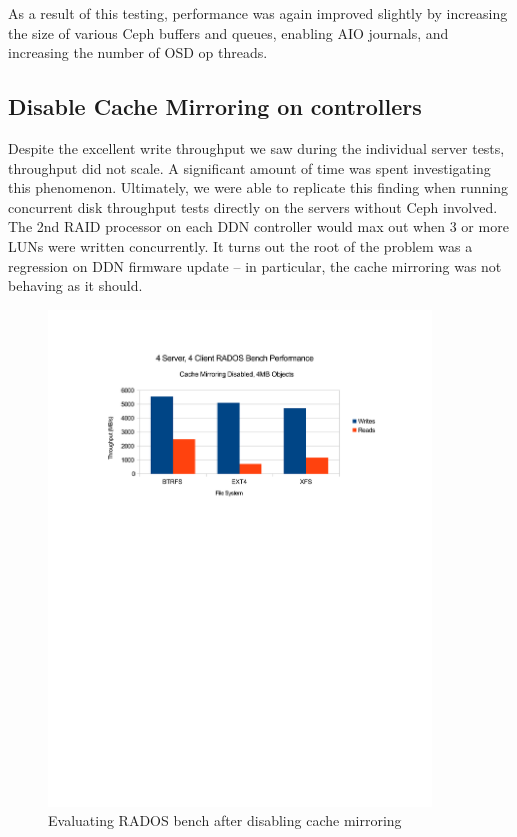 \documentclass{article}
\begin{document}
As a result of this testing, performance was again improved slightly by
increasing the size of various Ceph buffers and queues, enabling AIO journals,
and increasing the number of OSD op threads.


\subsection{Disable Cache Mirroring on controllers}


Despite the excellent write throughput we saw during the individual server
tests, throughput did not scale.  A significant amount of time was spent
investigating this phenomenon. Ultimately, we were able to replicate this finding
when running concurrent disk throughput tests directly on the servers without
Ceph involved. The 2nd RAID processor on each DDN controller would max out when
3 or more LUNs were written concurrently. It turns out the root of the problem
was a regression on DDN firmware update -- in particular, the cache
mirroring was not behaving as it should.


\begin{figure}[htb]
\centering
\includegraphics[width=4in]{rados-after-ddn}
\caption{Evaluating RADOS bench after disabling cache mirroring}
\label{fig:rados-ddn-mirror-disabled}
\end{figure}
\end{document}
